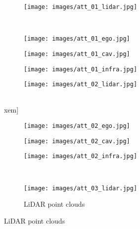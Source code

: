 \documentclass[runningheads]{llncs}
\begin{document}
\begin{figure}[!tb]
     \centering
     \def\xwidth{0.32}
     \def\xxwidth{0.4}
     \def\xem{-3pt}
     \begin{subfigure}[b]{\xxwidth\textwidth}
         \centering
         \texttt{[image: images/att\_01\_lidar.jpg]}
\label{fig:att_lidar1}
     \end{subfigure}
     \\ [\xem]
     \begin{subfigure}[b]{\xwidth\textwidth}
         \centering
         \texttt{[image: images/att\_01\_ego.jpg]}
\label{fig:att_ego1}
     \end{subfigure}
     \begin{subfigure}[b]{\xwidth\textwidth}
         \centering
         \texttt{[image: images/att\_01\_cav.jpg]}
\label{fig:att_cav1}
     \end{subfigure}
     \begin{subfigure}[b]{\xwidth\textwidth}
         \centering
         \texttt{[image: images/att\_01\_infra.jpg]}
\label{fig:att_infra1}
     \end{subfigure}
          \begin{subfigure}[b]{\xxwidth\textwidth}
         \centering
         \texttt{[image: images/att\_02\_lidar.jpg]}
\label{fig:att_lidar2}
     \end{subfigure}
     \\xem]
     \begin{subfigure}[b]{\xwidth\textwidth}
         \centering
         \texttt{[image: images/att\_02\_ego.jpg]}
\label{fig:att_ego2}
     \end{subfigure}
     \begin{subfigure}[b]{\xwidth\textwidth}
         \centering
         \texttt{[image: images/att\_02\_cav.jpg]}
\label{fig:att_cav2}
     \end{subfigure}
     \begin{subfigure}[b]{\xwidth\textwidth}
         \centering
         \texttt{[image: images/att\_02\_infra.jpg]}
\label{fig:att_infra2}
     \end{subfigure}
     \\
          \begin{subfigure}[b]{\xxwidth\textwidth}
         \centering
         \texttt{[image: images/att\_03\_lidar.jpg]}
         \caption{LiDAR point clouds}
         \label{fig:att_lidar3}

\end{subfigure}
\end{figure}
\end{document}
